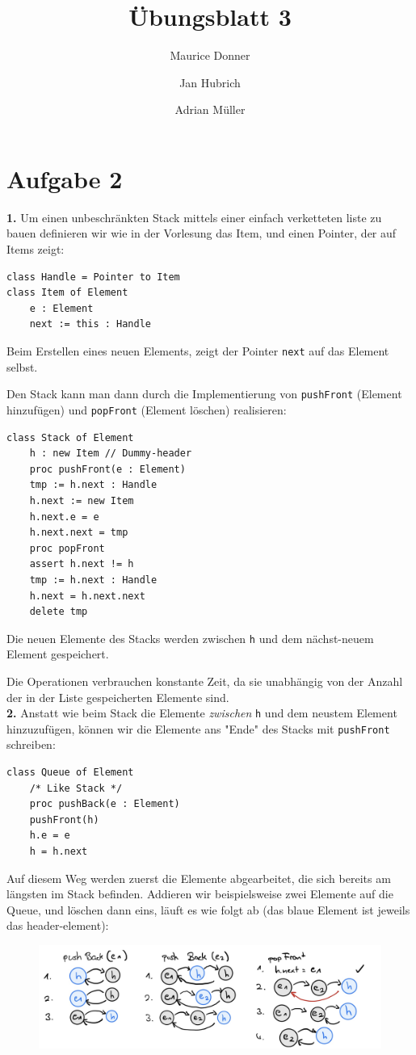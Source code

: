 \documentclass{article}
\title{\textsf{\color{blue!40!black}Übungsblatt 3}}
\author{Maurice Donner \and Jan Hubrich \and Adrian Müller}
\begin{document}
\maketitle
\newpage

\section*{Aufgabe 2}
\textbf{1.} Um einen unbeschränkten Stack mittels einer einfach verketteten liste zu bauen
definieren wir wie in der Vorlesung das Item, und einen Pointer, der auf Items zeigt:
\begin{lstlisting}
class Handle = Pointer to Item
class Item of Element
    e : Element
    next := this : Handle
\end{lstlisting}
Beim Erstellen eines neuen Elements, zeigt der Pointer \texttt{next} auf das Element
selbst.

Den Stack kann man dann durch die Implementierung von \texttt{pushFront} (Element
hinzufügen) und \texttt{popFront} (Element löschen) realisieren:
\begin{lstlisting}
class Stack of Element
    h : new Item // Dummy-header
    proc pushFront(e : Element)
	tmp := h.next : Handle
	h.next := new Item
	h.next.e = e 
	h.next.next = tmp
    proc popFront
	assert h.next != h
	tmp := h.next : Handle
	h.next = h.next.next
	delete tmp
\end{lstlisting}

Die neuen Elemente des Stacks werden zwischen \texttt{h} und dem nächst-neuem Element
gespeichert.

Die Operationen verbrauchen konstante Zeit, da sie unabhängig von der Anzahl der in
der Liste gespeicherten Elemente sind.\\

\textbf{2.} Anstatt wie beim Stack die Elemente \textit{zwischen} \texttt{h} und
dem neustem Element hinzuzufügen, können wir die Elemente ans "Ende" des Stacks
mit \texttt{pushFront} schreiben:
\begin{lstlisting}
class Queue of Element
    /* Like Stack */
    proc pushBack(e : Element)
	pushFront(h)
	h.e = e
	h = h.next
\end{lstlisting}
Auf diesem Weg werden zuerst die Elemente abgearbeitet, die sich bereits am längsten
im Stack befinden. Addieren wir beispielsweise zwei Elemente auf die Queue, und
löschen dann eins, läuft es wie folgt ab (das blaue Element ist jeweils das header-element):
\begin{figure}[H]
    \centering
    \includegraphics[width=.9\textwidth]{Queue.jpg}
\end{figure}
\end{document}
